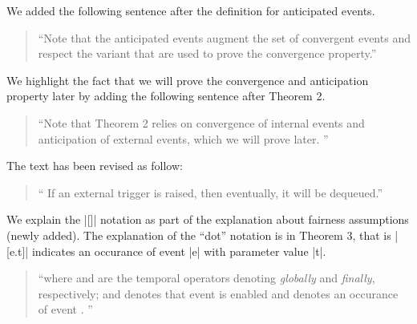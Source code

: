 \documentclass{response}
\begin{document}
\begin{response}
  We added the following sentence after the definition for anticipated events.
  \begin{quote}
    ``Note that the anticipated events augment the set of convergent
    events and respect the variant that are used to prove the
    convergence property.''
  \end{quote}
\end{response}

\begin{comment}{Reviewer \#1}
• p.22 Proof of Convergence an Anticipation I wonder if this paragraph should 
not be before because you use such arguments before just after stating Theorem 
2.
\end{comment}

\begin{response}
  We highlight the fact that we will prove the convergence and
  anticipation property later by adding the following sentence after
  Theorem 2.
  \begin{quote}
    ``Note that Theorem 2 relies on convergence
  of internal events and anticipation of external events, which we
  will prove later.   ''
  \end{quote}
\end{response}

\begin{comment}{Reviewer \#1}
• p.23 typo. it will be dequeued.
\end{comment}

\begin{response}
  The text has been revised as follow:
  \begin{quote}
    `` If an external trigger is raised, then eventually, it will be dequeued.''
  \end{quote}
\end{response}

\begin{comment}{Reviewer \#1}
• p. 23 could you explain the square bracket notation, e.g. [externalTrigger.t]
\end{comment}

\begin{response}
  We explain the |[]| notation as part of the explanation about
  fairness assumptions (newly added). The explanation of the ``dot''
  notation is in Theorem 3, that is |[e.t]| indicates an occurance of
  event |e| with parameter value |t|.
  \begin{quote}
    ``where \mbox{} and \mbox{} are the
  temporal operators denoting \emph{globally} and \emph{finally},
  respectively; and \mbox{} denotes that
  event \mbox{} is enabled and
  \mbox{\EventBInline{[e]}} denotes an occurance of event
  \mbox{}.
   ''
  \end{quote}
\end{response}
\end{document}
